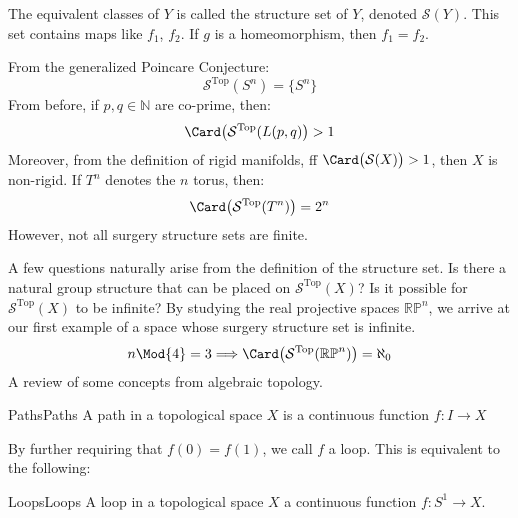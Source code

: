\documentclass{article}                                                        %
\begin{document}
        The equivalent classes of $Y$ is called the
        structure set of $Y$,
        denoted $\mathcal{S}(Y)$. This set contains maps
        like $f_{1}$, $f_{2}$.
        If $g$ is a homeomorphism, then $f_{1}=f_{2}$.
        \begin{lexample}{}{}
            From the generalized Poincare Conjecture:
            \begin{equation}
                \mathcal{S}^{\textrm{Top}}(S^{n})
                =\{S^{n}\}
            \end{equation}
            From before, if $p,q\in\mathbb{N}$ are co-prime, then:
            \begin{equation}
                \Card\big(\mathcal{S}^{\textrm{Top}}(L(p,q)\big)>1
            \end{equation}
            Moreover, from the definition of rigid manifolds,
            ff $\Card\big(\mathcal{S}(X)\big)>1$, then $X$ is non-rigid.
            If $T^{n}$ denotes the $n$ torus, then:
            \begin{equation}
                \Card\big(\mathcal{S}^{\textrm{Top}}(T^{n})\big)
                =2^{n}
            \end{equation}
            However, not all surgery structure sets are finite.
        \end{lexample}
        A few questions naturally arise from the
        definition of the structure set. Is there a natural group
        structure that can be placed on $\mathcal{S}^{\textrm{Top}}(X)$?
        Is it possible for $\mathcal{S}^{\textrm{Top}}(X)$ to be infinite?
        By studying the real projective spaces $\mathbb{RP}^{n}$, we
        arrive at our first example of a space whose surgery structure
        set is infinite.
        \begin{equation}
            n\Mod{4}=3
            \Longrightarrow
            \Card\big(\mathcal{S}^{\textrm{Top}}(\mathbb{RP}^{n})\big)
            =\aleph_{0}
        \end{equation}
        A review of some concepts from algebraic topology.
        \begin{ldefinition}{Paths}{Paths}
            A path in a topological space $X$ is a
            continuous function $f:I\rightarrow{X}$
        \end{ldefinition}
        By further requiring that $f(0)=f(1)$, we call $f$ a loop. This is
        equivalent to the following:
        \begin{ldefinition}{Loops}{Loops}
            A loop in a topological space $X$ a continuous function
            $f:S^{1}\rightarrow{X}$.
        \end{ldefinition}
\end{document}

